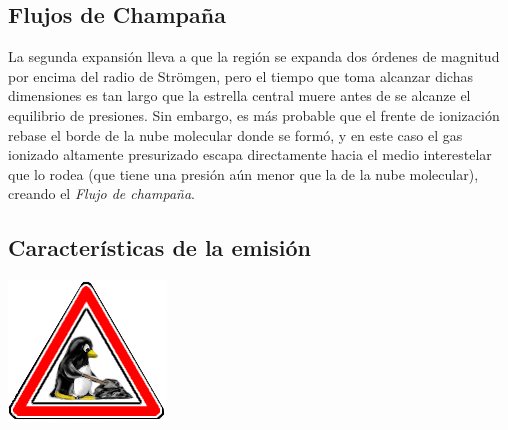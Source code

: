 \subsection{Flujos de Champaña}
La segunda expansión lleva a que la región  se expanda dos órdenes de magnitud por encima del radio de Strömgen, pero el tiempo que toma alcanzar dichas dimensiones es tan largo que la estrella central muere antes de se alcanze el equilibrio de presiones. Sin embargo, es más probable que el frente de ionización rebase el borde de la nube molecular donde se formó, y en este caso el gas ionizado altamente presurizado escapa directamente hacia el medio interestelar que lo rodea (que tiene una presión aún menor que la de la nube molecular), creando el \textit{Flujo de champaña}.

\subsection{Características de la emisión}

\includegraphics[width=0.1\linewidth]{./Figures/tux-development}
